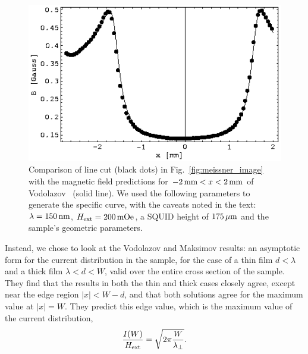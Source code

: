 %
%
\begin{figure}[p]
\includegraphics[width=5.7in]{figs/magpen/fig10.ps}
\caption[Comparison of Meissner state field profile with 
Vodolazov \etal\ predictions.]
{Comparison of line cut (black dots) in 
Fig.~\ref{fig:meissner_image}
with the magnetic field predictions for $-2\,\mathrm{mm}<x<2\,\mathrm{mm}$ 
of Vodolazov \etal\ (solid line).
We used the following parameters to generate the specific curve, with 
the caveats noted in the text: $\lambda = 150\,\mathrm{nm}$, 
$H_{\mathrm{ext}}=200\,\mathrm{mOe}$, a SQUID height of $175\,\mu\mathrm{m}$
and the sample's geometric parameters.  
}
\label{fig:vodo_comparison}
\end{figure}


Instead, we chose to look at the
Vodolazov and Maksimov\cite{vodolazov_physc_349_125_2001} results:
an asymptotic form for the current 
distribution in the sample, for the case of a thin film $d<\lambda$ and
a thick film $\lambda < d < W$, valid over the entire cross section
of the sample.  They find that 
the results in both the thin and thick
cases closely agree, except near the edge region
$\left| x \right| < W - d$, and that both solutions agree for the 
maximum value at
$\left| x \right| = W$. 
They predict this edge value, which is the maximum value of the current 
distribution, 
%
\begin{equation}
{I(W)\over H_{\mathrm{ext}}}= \sqrt{2\pi{ W \over \lambda_\perp }}.
\label{eqn:current_maximum}
\end{equation}
%

